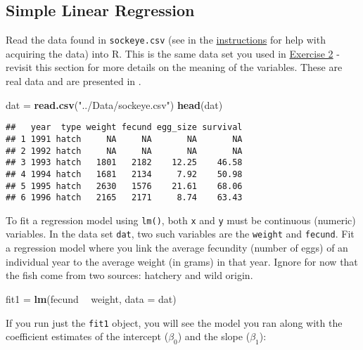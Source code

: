\documentclass[]{book}
\newenvironment{Shaded}{\begin{snugshade}}{\end{snugshade}}
\newcommand{\KeywordTok}[1]{\textcolor[rgb]{0.13,0.29,0.53}{\textbf{#1}}}
\newcommand{\DataTypeTok}[1]{\textcolor[rgb]{0.13,0.29,0.53}{#1}}
\newcommand{\StringTok}[1]{\textcolor[rgb]{0.31,0.60,0.02}{#1}}
\newcommand{\OperatorTok}[1]{\textcolor[rgb]{0.81,0.36,0.00}{\textbf{#1}}}
\newcommand{\NormalTok}[1]{#1}
\theoremstyle{definition}
\theoremstyle{definition}
\theoremstyle{definition}
\theoremstyle{remark}
\begin{document}
\subsection{Simple Linear Regression}\label{regression}

Read the data found in \texttt{sockeye.csv} (see in the
\protect\hyperlink{data-sets}{instructions} for help with acquiring the
data) into R. This is the same data set you used in
\protect\hyperlink{ex2}{Exercise 2} - revisit this section for more
details on the meaning of the variables. These are real data and are
presented in \citet{sockeye-cite}.

\begin{Shaded}
\begin{Highlighting}[]
\NormalTok{dat =}\StringTok{ }\KeywordTok{read.csv}\NormalTok{(}\StringTok{"../Data/sockeye.csv"}\NormalTok{)}
\KeywordTok{head}\NormalTok{(dat)}
\end{Highlighting}
\end{Shaded}

\begin{verbatim}
##   year  type weight fecund egg_size survival
## 1 1991 hatch     NA     NA       NA       NA
## 2 1992 hatch     NA     NA       NA       NA
## 3 1993 hatch   1801   2182    12.25    46.58
## 4 1994 hatch   1681   2134     7.92    50.98
## 5 1995 hatch   2630   1576    21.61    68.06
## 6 1996 hatch   2165   2171     8.74    63.43
\end{verbatim}

To fit a regression model using \texttt{lm()}, both \texttt{x} and
\texttt{y} must be continuous (numeric) variables. In the data set
\texttt{dat}, two such variables are the \texttt{weight} and
\texttt{fecund}. Fit a regression model where you link the average
fecundity (number of eggs) of an individual year to the average weight
(in grams) in that year. Ignore for now that the fish come from two
sources: hatchery and wild origin.

\begin{Shaded}
\begin{Highlighting}[]
\NormalTok{fit1 =}\StringTok{ }\KeywordTok{lm}\NormalTok{(fecund }\OperatorTok{~}\StringTok{ }\NormalTok{weight, }\DataTypeTok{data =}\NormalTok{ dat)}
\end{Highlighting}
\end{Shaded}

If you run just the \texttt{fit1} object, you will see the model you ran
along with the coefficient estimates of the intercept (\(\beta_0\)) and
the slope (\(\beta_1\)):
\end{document}
